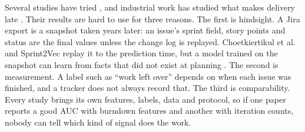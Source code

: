 Several studies have tried \cite{choet2018,sprint2vec,hearty2009,perez2024,obike2025}, and industrial work has studied what makes delivery late \cite{kula2022}. Their results are hard to use for three reasons. The first is hindsight. A Jira export is a snapshot taken years later: an issue's sprint field, story points and status are the final values unless the change log is replayed. Choetkiertikul et al.\ \cite{choet2018} and Sprint2Vec \cite{sprint2vec} replay it to the prediction time, but a model trained on the snapshot can learn from facts that did not exist at planning \cite{kaufman2012,kapoor2023}. The second is measurement. A label such as ``work left over'' depends on when each issue was finished, and a tracker does not always record that. The third is comparability. Every study brings its own features, labels, data and protocol, so if one paper reports a good AUC with burndown features and another with iteration counts, nobody can tell which kind of signal does the work.

